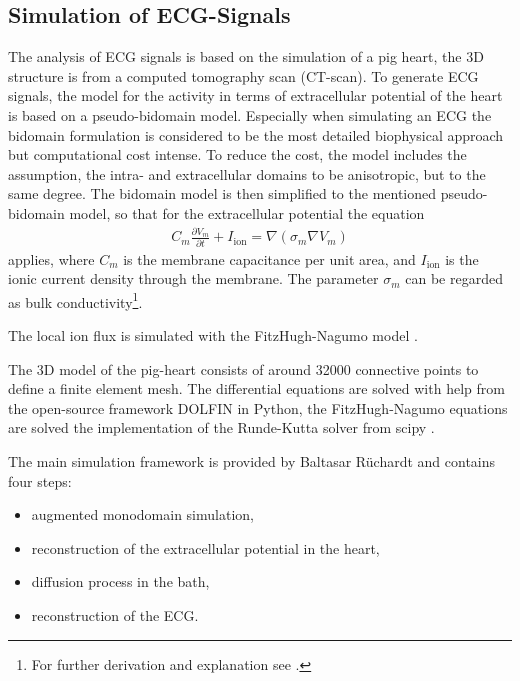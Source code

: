 \subsection{Simulation of ECG-Signals}\label{cap:simulation}
The analysis of ECG signals is based on the simulation of a pig heart, the 3D structure is from a computed tomography scan (CT-scan).
To generate ECG signals, the model for the activity in terms of extracellular potential of the heart is based on a pseudo-bidomain model. Especially when simulating an ECG the bidomain formulation is considered to be the most detailed biophysical approach \cite{bishop_bidomain_2011} but computational cost intense. To reduce the cost, the model includes the assumption, the intra- and extracellular domains to be anisotropic, but to the same degree. The bidomain model is then simplified to the mentioned pseudo-bidomain model, so that for the extracellular potential the equation 
\begin{align}
    C_m\frac{\partial V_m}{\partial t}+I_{\text{ion}}=\nabla(\sigma_m\nabla V_m)
\end{align}
applies, where $C_m$ is the membrane capacitance per unit area, and $I_\text{ion}$ is the ionic current density through the membrane. The parameter $\sigma_m$ can be regarded as bulk conductivity\footnote{For further derivation and explanation see \cite{bishop_bidomain_2011}.}.

The local ion flux is simulated with the FitzHugh-Nagumo model \cite{fitzhugh_1955}.

The 3D model of the pig-heart consists of around 32000 connective points to define a finite element mesh. The differential equations are solved with help from the open-source framework DOLFIN \cite{LoggWells2010a} in Python, the FitzHugh-Nagumo equations are solved the implementation of the Runde-Kutta solver from scipy \cite{2020SciPy_NMeth}.

The main simulation framework is provided by Baltasar Rüchardt \cite{baltasar} and contains four steps:\\
\begin{itemize}
    \item augmented monodomain simulation,
    \item reconstruction of the extracellular potential in the heart,
    \item diffusion process in the bath,
    \item reconstruction of the ECG.
\end{itemize}

